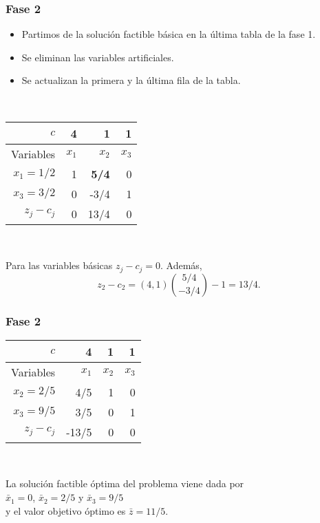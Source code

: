 \documentclass{beamer}
\begin{document}
\begin{frame}
\frametitle{Fase 2}

\begin{itemize}
\item Partimos de la solución factible básica en la última tabla de la fase 1.

\item Se eliminan las variables artificiales.

\item Se actualizan la primera y la última fila de la tabla.
\end{itemize}

\

\begin{center}
\begin{tabular}{r | rrr}
$c$ & 4 & 1 & 1  \\ \hline
Variables & $x_1$ & $x_2$ & $x_3$  \\ \hline
$x_1=1/2$ & 1 & \textbf{5/4} & 0  \\
$x_3=3/2$   & 0 & -3/4 & 1   \\ \hline 
$z_j-c_j$ &  0 & 13/4 & 0 
\end{tabular}
\end{center} 

\


Para las variables básicas $z_j-c_j=0$. Además,
\[
z_2-c_2 = (4,1){5/4 \choose -3/4}- 1 = 13/4.
\]


\end{frame}
\begin{frame}
\frametitle{Fase 2}



\begin{center}
\begin{tabular}{r | rrr}
$c$ & 4 & 1 & 1  \\ \hline
Variables & $x_1$ & $x_2$ & $x_3$  \\ \hline
$x_2=2/5$ & 4/5 & 1 & 0  \\
$x_3=9/5$   & 3/5 & 0 & 1   \\ \hline 
$z_j-c_j$ &  -13/5 & 0 & 0 
\end{tabular}
\end{center} 

\




La solución factible óptima del problema viene dada por\\ $\bar{x}_1=0$, $\bar{x}_2=2/5$ y $\bar{x}_3=9/5$\\ y el valor objetivo óptimo es $\bar{z}=11/5$.


\end{frame}
\end{document}

